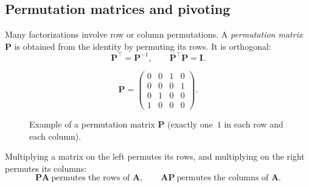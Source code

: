\subsection{Permutation matrices and pivoting}
Many factorizations involve row or column permutations. A \emph{permutation
matrix} $\mathbf{P}$ is obtained from the identity by permuting its rows. It is
orthogonal:
\[
  \mathbf{P}^\top = \mathbf{P}^{-1},\qquad \mathbf{P}^\top\mathbf{P}=\mathbf{I}.
\]
\begin{figure}[ht]
    \centering
    \[
      \mathbf{P}=
      \begin{pmatrix}
        0 & 0 & 1 & 0\\
        0 & 0 & 0 & 1\\
        0 & 1 & 0 & 0\\
        1 & 0 & 0 & 0
      \end{pmatrix}.
    \]
    \caption{Example of a permutation matrix $\mathbf{P}$ (exactly one~$1$ in
    each row and each column).}
    \label{fig:permutation-matrix}
\end{figure}
Multiplying a matrix on the left permutes its rows, and multiplying on the
right permutes its columns:
\[
  \mathbf{P}\mathbf{A}\ \text{permutes the rows of }\mathbf{A},\qquad
  \mathbf{A}\mathbf{P}\ \text{permutes the columns of }\mathbf{A}.
\]



